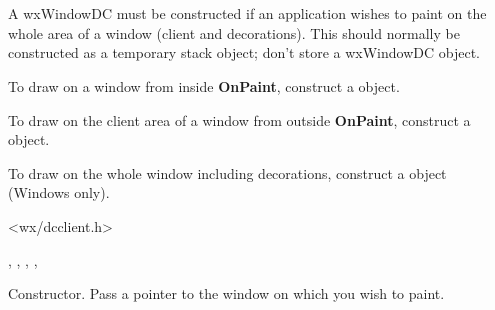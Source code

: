 \section{}\label{wxwindowdc}

A wxWindowDC must be constructed if an application wishes to paint on the
whole area of a window (client and decorations).
This should normally be constructed as a temporary stack object; don't store
a wxWindowDC object.

To draw on a window from inside {\bf OnPaint}, construct a  object.

To draw on the client area of a window from outside {\bf OnPaint}, construct a  object.

To draw on the whole window including decorations, construct a  object
(Windows only).




<wx/dcclient.h>


, , ,\rtfsp
{}, 




Constructor. Pass a pointer to the window on which you wish to paint.



